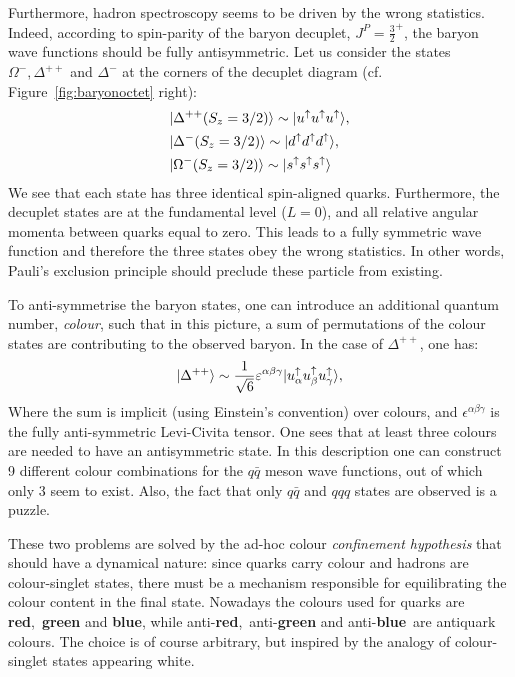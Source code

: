 Furthermore, hadron spectroscopy seems to be driven by the wrong
statistics. Indeed, according to spin-parity of the baryon decuplet,
$J^{P} = \frac{3}{2}^{+}$, the baryon wave functions should be fully antisymmetric. Let us consider
the states $\Omega^{-}, \Delta^{++}$ and $\Delta^{-}$ at the
corners of the decuplet diagram (cf. Figure~\ref{fig:baryonoctet} right):
\begin{align*}
&|\Delta^{++}(S_{z}=3/2)\rangle \sim |u^\uparrow u^\uparrow
  u^\uparrow\rangle,\\
&|\Delta^{-}(S_{z}=3/2)\rangle \sim |d^\uparrow d^\uparrow
  d^\uparrow\rangle,\\
&|\Omega^{-}(S_{z}=3/2)\rangle \sim |s^\uparrow s^\uparrow s^\uparrow\rangle
\end{align*}
We see that each state has three identical spin-aligned quarks. Furthermore, the
decuplet states are at the fundamental level ($L=0$), and all relative
angular momenta between quarks equal to zero. This leads to a fully
symmetric wave function and therefore the three
states obey the wrong statistics. In other words, Pauli's exclusion principle should preclude these particle from existing. 

To anti-symmetrise the baryon states, one can introduce an additional
quantum number, \textit{colour}, such that in this picture, a sum of
permutations of the colour states are contributing to the observed
baryon. In the case of $\Delta^{++}$, one has:
\begin{equation}
|\Delta^{++}\rangle \sim \frac{1}{\sqrt{6}}\varepsilon^{\alpha\beta\gamma}|u_{\alpha}^\uparrow u_{\beta}^\uparrow
  u_{\gamma}^\uparrow\rangle,
\end{equation}
Where the sum is implicit (using Einstein's convention) over
colours, and $\epsilon^{\alpha\beta\gamma}$ is the fully
anti-symmetric Levi-Civita tensor. One sees that at least three
colours are needed to have an antisymmetric state. In this
description one can construct 9 different colour combinations for the
$q\bar{q}$ meson wave functions, out of which only 3 seem to exist. 
Also, the fact that only $q\bar{q}$ and $qqq$ states are observed is 
a puzzle. 

These two problems are solved by the ad-hoc colour
\textit{confinement hypothesis} that should have a dynamical nature:
since quarks carry colour and hadrons are colour-singlet 
states, there must be a mechanism responsible for equilibrating the
colour content in the final state. Nowadays the colours used for
quarks are
\color{red}\textbf{red}\color{black},~\color{green}\textbf{green}
\color{black}and 
\color{blue}\textbf{blue}\color{black}, while
anti-\color{red}\textbf{red}\color{black},~anti-\color{green}\textbf{green} \color{black} and
anti-\color{blue}\textbf{blue}\color{black}~are antiquark colours. The
choice is of course arbitrary, but inspired by the analogy of
colour-singlet states appearing white.

